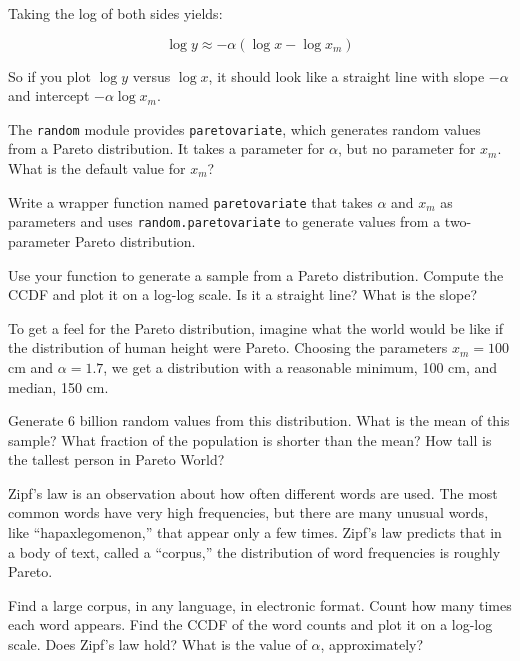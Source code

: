 \documentclass[12pt]{book}
\begin{document}
Taking the log of both sides yields:

\[ \log y \approx -\alpha (\log x - \log x_m ) \]

So if you plot $\log y$ versus $\log x$, it should look like a
straight line with slope $-\alpha$ and intercept $-\alpha \log x_m$.

\begin{ex}

The {\tt random} module provides {\tt paretovariate},
which generates random values from a Pareto distribution.  It takes
a parameter for $\alpha$, but no parameter for $x_m$.  What is
the default value for $x_m$?

Write a wrapper function named {\tt paretovariate} that takes $\alpha$
and $x_m$ as parameters and uses {\tt random.paretovariate} to
generate values from a two-parameter Pareto distribution.

Use your function to generate a sample from a Pareto distribution.
Compute the CCDF and plot it on a log-log scale.  Is it a straight
line?  What is the slope?

\end{ex}

\begin{ex}

To get a feel for the Pareto distribution, imagine what the world
would be like if the distribution of human height were Pareto.
Choosing the parameters $x_m = 100$ cm and $\alpha = 1.7$, we
get a distribution with a reasonable minimum, 100 cm,
and median, 150 cm.

Generate 6 billion random values from this distribution.  What is the
mean of this sample?  What fraction of the population is shorter than
the mean?  How tall is the tallest person in Pareto World?

\end{ex}

\begin{ex}

Zipf's law is an observation about how often different words are used.
The most common words have very high frequencies, but there are many
unusual words, like ``hapaxlegomenon,'' that appear only a few times.
Zipf's law predicts that in a body of text, called a ``corpus,'' the
distribution of word frequencies is roughly Pareto.

Find a large corpus, in any language, in electronic
format.  Count how many times each word appears.  Find the CCDF of the
word counts and plot it on a log-log scale.  Does Zipf's law hold?
What is the value of $\alpha$, approximately?

\end{ex}
\end{document}
